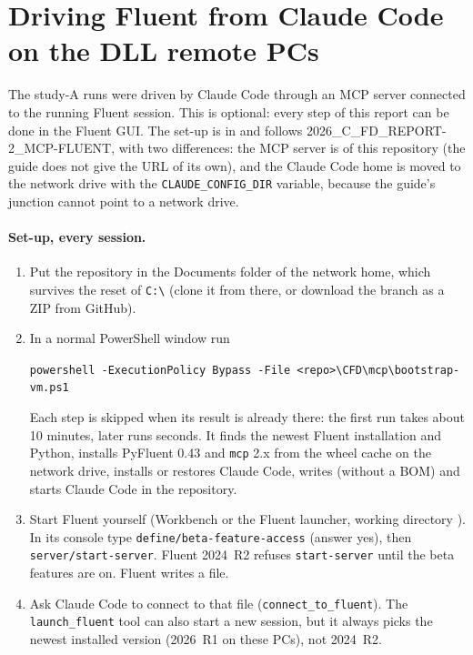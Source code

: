 \section{Driving Fluent from Claude Code on the DLL remote PCs}
\label{app:claude}

The study-A runs were driven by Claude Code through an MCP server connected to the running Fluent
session. This is optional: every step of this report can be done in the Fluent GUI. The set-up is in
 and follows 2026\_C\_FD\_REPORT-2\_MCP-FLUENT, with two differences: the MCP server is
 of this repository (the guide does not give the URL of its own), and the
Claude Code home is moved to the network drive with the \texttt{CLAUDE\_CONFIG\_DIR} variable, because
the guide's junction cannot point to a network drive.

\paragraph{Set-up, every session.}
\begin{enumerate}
\item Put the repository in the Documents folder of the network home, which survives the reset of
\texttt{C:\textbackslash} (clone it from there, or download the branch as a ZIP from GitHub).
\item In a normal PowerShell window run
\begin{center}
\small\texttt{powershell -ExecutionPolicy Bypass -File <repo>\textbackslash CFD\textbackslash mcp\textbackslash bootstrap-vm.ps1}
\end{center}
Each step is skipped when its result is already there: the first run takes about 10 minutes, later runs
seconds. It finds the newest Fluent installation and Python, installs PyFluent 0.43 and \texttt{mcp} 2.x
from the wheel cache on the network drive, installs or restores Claude Code, writes 
(without a BOM) and starts Claude Code in the repository.
\item Start Fluent yourself (Workbench or the Fluent launcher, working directory ). In
its console type \texttt{define/beta-feature-access} (answer yes), then \texttt{server/start-server}.
Fluent 2024~R2 refuses \texttt{start-server} until the beta features are on. Fluent writes a
 file.
\item Ask Claude Code to connect to that file (\texttt{connect\_to\_fluent}). The \texttt{launch\_fluent}
tool can also start a new session, but it always picks the newest installed version (2026~R1 on these
PCs), not 2024~R2.
\end{enumerate}

